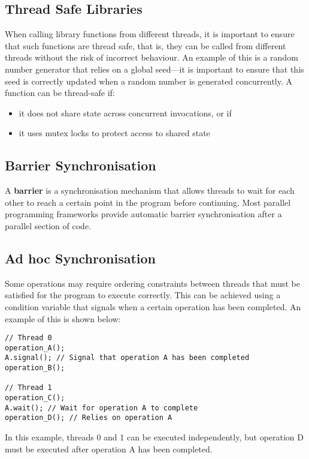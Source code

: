 \documentclass{article}
\begin{document}
\subsection{Thread Safe Libraries}
When calling library functions from different threads, it is important
to ensure that such functions are thread safe, that is, they can be
called from different threads without the risk of incorrect behaviour.
An example of this is a random number generator that relies on a global
seed---it is important to ensure that this seed is correctly updated
when a random number is generated concurrently. A function can be
thread-safe if:
\begin{itemize}
    \item it does not share state across concurrent invocations, or if
    \item it uses mutex locks to protect access to shared state
\end{itemize}
\subsection{Barrier Synchronisation}
A \textbf{barrier} is a synchronisation mechanism that allows threads
to wait for each other to reach a certain point in the program before
continuing. Most parallel programming frameworks provide automatic
barrier synchronisation after a parallel section of code.
\subsection{Ad hoc Synchronisation}
Some operations may require ordering constraints between threads that
must be satisfied for the program to execute correctly. This can be
achieved using a condition variable that signals when a certain
operation has been completed. An example of this is shown below:
\begin{verbatim}
// Thread 0
operation_A();
A.signal(); // Signal that operation A has been completed
operation_B();

// Thread 1
operation_C();
A.wait(); // Wait for operation A to complete
operation_D(); // Relies on operation A
\end{verbatim}
In this example, threads 0 and 1 can be executed independently, but
operation D must be executed after operation A has been completed.
\end{document}
